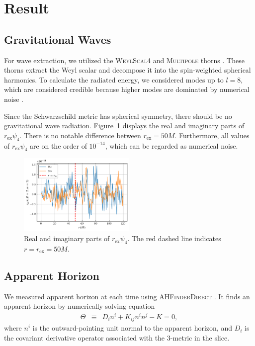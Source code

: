 \documentclass[%
 reprint,
 amsmath,amssymb,
 aps,
 prd,
]{revtex4-2}
\begin{document}
\section{Result}

\subsection{Gravitational Waves}

For wave extraction, we utilized the \textsc{WeylScal4} and \textsc{Multipole} thorns \cite{Baker:2001sf}. These thorns extract the Weyl scalar and decompose it into the spin-weighted spherical harmonics. To calculate the radiated energy, we considered modes up to $l=8$, which are considered credible because higher modes are dominated by numerical noise \cite{Pollney:2009yz}.

Since the Schwarzschild metric has spherical symmetry, there should be no gravitational wave radiation. Figure~\ref{fig:psi4_r50} displays the real and imaginary parts of $r_\mathrm{ex}\psi_4$. There is no notable difference between $r_\mathrm{ex} = 50M$. Furthermore, all values of $r_\mathrm{ex}\psi_4$ are on the order of $10^{-14}$, which can be regarded as numerical noise.

\begin{figure}[h]
	\includegraphics[width=0.5\textwidth]{data/psi4_r50.png}%
	\caption{\label{fig:psi4_r50} Real and imaginary parts of $r_\mathrm{ex}\psi_4$. The red dashed line indicates $r=r_\mathrm{ex}=50M$.}
\end{figure}



\subsection{Apparent Horizon}

We measured apparent horizon at each time using \textsc{AHFinderDirect} \cite{Thornburg:1995cp, Thornburg:2003sf}. It finds an apparent horizon by numerically solving equation
\begin{eqnarray}
	\Theta &\equiv & D_i n^i + K_{ij} n^i n^j - K = 0,
\end{eqnarray}
where $n^i$ is the outward-pointing unit normal to the apparent horizon, and $D_i$ is the covariant derivative operator associated with the 3-metric in the slice.
\end{document}
